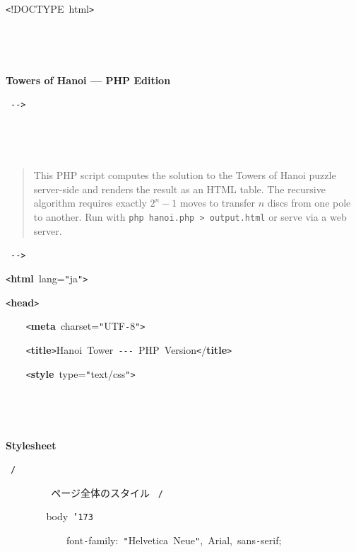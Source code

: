 \documentclass[a4paper,10pt]{article}
\def\mc{\relax}
\begin{document}
\tt\mc 

\noindent
\mbox{}{\tt <}!DOCTYPE{\tt\mc \ }html{\tt >}

\noindent
\mbox{}\rm\mc {\tt <}{\tt !}{\tt -}{\tt -}\  \parbox[t]{0.85\textwidth}{\ \centerline{\bf Towers of Hanoi --- PHP Edition}} \rm\mc \ {\tt -}{\tt -}{\tt >}
\tt\mc 

\noindent
\mbox{}\rm\mc {\tt <}{\tt !}{\tt -}{\tt -}\ 
\tt\mc 

\noindent
\mbox{}\rm\mc \ \begin{quote}
\noindent
This PHP script computes the solution to the Towers of Hanoi
puzzle server-side and renders the result as an HTML table.
The recursive algorithm requires exactly $2^n - 1$ moves to
transfer $n$ discs from one pole to another.  Run with
{\tt php hanoi.php > output.html} or serve via a web server.
\end{quote} 
\tt\mc 

\noindent
\mbox{}\rm\mc \ {\tt -}{\tt -}{\tt >}
\tt\mc 

\noindent
\mbox{}{\tt <}\textbf{html}{\tt\mc \ }lang={\tt "}ja{\tt "}{\tt >}

\noindent
\mbox{}{\tt <}\textbf{head}{\tt >}

\noindent
\mbox{}{\tt\mc \ }{\tt\mc \ }{\tt\mc \ }{\tt\mc \ }{\tt <}\textbf{meta}{\tt\mc \ }charset={\tt "}UTF{\tt -}8{\tt "}{\tt >}

\noindent
\mbox{}{\tt\mc \ }{\tt\mc \ }{\tt\mc \ }{\tt\mc \ }{\tt <}\textbf{title}{\tt >}Hanoi{\tt\mc \ }Tower{\tt\mc \ }{\tt -}{\tt -}{\tt -}{\tt\mc \ }PHP{\tt\mc \ }Version{\tt <}/\textbf{title}{\tt >}

\noindent
\mbox{}{\tt\mc \ }{\tt\mc \ }{\tt\mc \ }{\tt\mc \ }{\tt <}\textbf{style}{\tt\mc \ }type={\tt "}text/css{\tt "}{\tt >}

\noindent
\mbox{}{\tt\mc \ }{\tt\mc \ }{\tt\mc \ }{\tt\mc \ }{\tt\mc \ }{\tt\mc \ }{\tt\mc \ }{\tt\mc \ }\rm\mc {\tt /}{\tt *}\  \parbox[t]{0.85\textwidth}{\ \centerline{\bf Stylesheet}} \rm\mc \ {\tt *}{\tt /}
\tt\mc 

\noindent
\mbox{}{\tt\mc \ }{\tt\mc \ }{\tt\mc \ }{\tt\mc \ }{\tt\mc \ }{\tt\mc \ }{\tt\mc \ }{\tt\mc \ }\rm\mc {\tt /}{\tt *}\  ページ全体のスタイル \rm\mc \ {\tt *}{\tt /}
\tt\mc 

\noindent
\mbox{}{\tt\mc \ }{\tt\mc \ }{\tt\mc \ }{\tt\mc \ }{\tt\mc \ }{\tt\mc \ }{\tt\mc \ }{\tt\mc \ }body{\tt\mc \ }{\tt\char'173}

\noindent
\mbox{}{\tt\mc \ }{\tt\mc \ }{\tt\mc \ }{\tt\mc \ }{\tt\mc \ }{\tt\mc \ }{\tt\mc \ }{\tt\mc \ }{\tt\mc \ }{\tt\mc \ }{\tt\mc \ }{\tt\mc \ }font{\tt -}family:{\tt\mc \ }{\tt "}Helvetica{\tt\mc \ }Neue{\tt "},{\tt\mc \ }Arial,{\tt\mc \ }sans{\tt -}serif;
\end{document}
